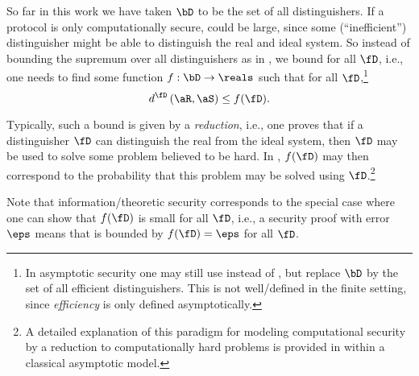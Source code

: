So far in this work we have taken $\bD$ to be the set of all
distinguishers. If a protocol is only computationally secure,
 could be large, since some (``inefficient'')
distinguisher might be able to distinguish the real and ideal
system. So instead of bounding the supremum over all distinguishers as
in , we bound  for all $\fD$,
i.e., one needs to find some function $f : \bD \to \reals$ such that
for all $\fD$,\footnote{In asymptotic security one may still use
   instead of , but replace $\bD$
  by the set of all efficient distinguishers. This is not
  well\-/defined in the finite setting, since \emph{efficiency} is
  only defined asymptotically.}
\begin{equation}
  \label{eq:adv5} 
  d^{\fD}\left(\aR,\aS\right) \leq f(\fD).
\end{equation}


Typically, such a bound is given by a \emph{reduction}, i.e., one
proves that if a distinguisher $\fD$ can distinguish the real from the
ideal system, then $\fD$ may be used to solve some problem believed to
be hard. In , $f(\fD)$ may then correspond to the
probability that this problem may be solved using $\fD$.\footnote{A
  detailed explanation of this paradigm for modeling computational
  security by a reduction to computationally hard problems is provided
  in \textcite{Rog06} within a classical asymptotic model.}

Note that information\-/theoretic security corresponds to the special
case where one can show that $f(\fD)$ is small for all $\fD$, i.e., a
security proof with error $\eps$ means that  is
bounded by $f(\fD) = \eps$ for all $\fD$.


